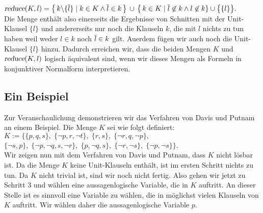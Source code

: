 $\textsl{reduce}(K,l)  = 
 \bigl\{\, k \backslash \{\overline{l}\} \;|\; k \in K \wedge \overline{l} \in k \,\bigr\} 
       \,\cup\, \bigl\{\, k \in K \mid \overline{l} \not\in k \wedge l \not\in k \} \cup \bigl\{\{l\}\bigr\}.
$
\\[0.2cm]
Die Menge enth\"{a}lt also einerseits die Ergebnisse von Schnitten mit
der Unit-Klausel $\{l\}$ und andererseits nur noch die Klauseln $k$,
die mit $l$ nichts zu tun haben weil weder $l \in k$ noch $\overline{l} \in k$
gilt.  Au\3erdem f\"{u}gen wir auch noch die Unit-Klausel $\{l\}$ hinzu.
Dadurch erreichen wir, dass die beiden Mengen $K$ und $\textsl{reduce}(K,l)$
logisch \"{a}quivalent sind, wenn wir dieses Mengen als Formeln in konjunktiver Normalform
interpretieren.  



\subsection{Ein Beispiel}
Zur Veranschaulichung demonstrieren wir das Verfahren von Davis und Putnam an einem Beispiel.
Die Menge $K$ sei wie folgt definiert: \\[0.2cm]
\hspace*{1.3cm} $K := \Big\{ \{p, q, s\},\; \{\neg p, r, \neg t\},\;  \{r, s\},\; \{\neg r, q, \neg p\},$ \\
\hspace*{2.5cm} $\{\neg s, p\},\; \{\neg p, \neg q, s, \neg r\},\; \{p, \neg q, s\},\; \{\neg r, \neg s\},\; \{\neg p, \neg s\} \Big\}  $. \\[0.2cm]
Wir zeigen nun mit dem Verfahren von Davis und Putnam, dass $K$ nicht l\"{o}sbar ist.  Da die
Menge $K$ keine Unit-Klauseln enth\"{a}lt, ist im ersten Schritt nichts zu tun.  Da $K$ nicht
trivial ist, sind wir noch nicht fertig.  Also gehen wir jetzt zu Schritt 3 und w\"{a}hlen
eine aussagenlogische Variable, die in $K$ auftritt.  An dieser Stelle ist es sinnvoll
eine Variable zu w\"{a}hlen, die in m\"{o}glichst vielen Klauseln von $K$ auftritt.  Wir w\"{a}hlen
daher die aussagenlogische Variable $p$.
